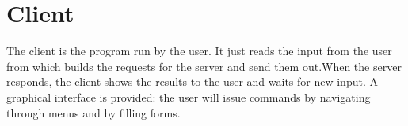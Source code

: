 \section{Client}\label{sec:client}

The client is the program run by the user. It just reads the input from the user
from which builds the requests for the server and send them out.When the server
responds, the client shows the results to the user and waits for new input. A
graphical interface is provided: the user will issue commands by navigating
through menus and by filling forms.
